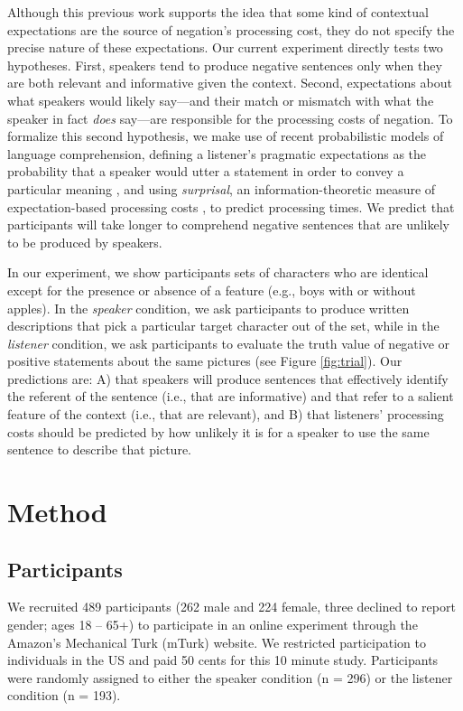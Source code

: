 \documentclass[man, noapacite]{apa2}
\begin{document}
Although this previous work supports the idea that some kind of contextual expectations are the source of negation's processing cost, they do not specify the precise nature of these expectations.  Our current experiment directly tests two hypotheses.  First, speakers tend to produce negative sentences only when they are both relevant and informative given the context.  Second, expectations about what speakers would likely say---and their match or mismatch with what the speaker in fact \emph{does} say---are responsible for the processing costs of negation. To formalize this second hypothesis, we make use of recent probabilistic models of language comprehension, defining a listener's pragmatic expectations as the probability that a speaker would utter a statement in order to convey a particular meaning \cite{frank2012}, and using \emph{surprisal}, an information-theoretic measure of expectation-based processing costs \cite{levy2008}, to predict processing times.  We predict that participants will take longer to comprehend negative sentences that are unlikely to be produced by speakers.

In our experiment, we show participants sets of characters who are identical except for the presence or absence of a feature (e.g., boys with or without apples). In the \emph{speaker} condition, we ask participants to produce written descriptions that pick a particular target character out of the set, while in the \emph{listener} condition, we ask participants to evaluate the truth value of negative or positive statements about the same pictures (see Figure \ref{fig:trial}). Our predictions are: A) that speakers will produce sentences that effectively identify the referent of the sentence (i.e., that are informative) and that refer to a salient feature of the context (i.e., that are relevant), and B) that listeners' processing costs should be predicted by how unlikely it is for a speaker to use the same sentence to describe that picture.

\section{Method}

\subsection{Participants} 

We recruited 489 participants (262 male and 224 female, three declined to report gender; ages 18 -- 65+) to participate in an online experiment through the Amazon's Mechanical Turk (mTurk) website.  We restricted participation to individuals in the US and paid 50 cents for this 10 minute study.  Participants were randomly assigned to either the speaker condition (n = 296) or the listener condition (n = 193).
\end{document}
